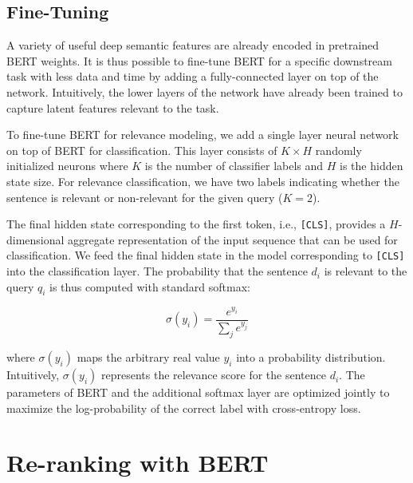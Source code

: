
\subsection{Fine-Tuning}

A variety of useful deep semantic features are already encoded in pretrained BERT weights.
It is thus possible to fine-tune BERT for a specific downstream task with less data and time by adding a fully-connected layer on top of the network.
Intuitively, the lower layers of the network have already been trained to capture latent features relevant to the task.

To fine-tune BERT for relevance modeling, we add a single layer neural network on top of BERT for classification.
This layer consists of $ K \times H $ randomly initialized neurons where $ K $ is the number of classifier labels and $ H$ is the hidden state size.
For relevance classification, we have two labels indicating whether the sentence is relevant or non-relevant for the given query ($ K = 2 $).

The final hidden state corresponding to the first token, i.e., \texttt{[CLS]}, provides a $ H $-dimensional aggregate representation of the input sequence that can be used for classification.
We feed the final hidden state in the model corresponding to \texttt{[CLS]} into the classification layer.
The probability that the sentence $ d_i $ is relevant to the query $ q_i $ is thus computed with standard softmax:
 
\begin{equation}
\sigma (y_i) = \frac{e^{y_i}}{\sum_j e^{y_j}}
\end{equation}

\noindent where $\sigma (y_i)$ maps the arbitrary real value $ y_i $ into a probability distribution.
Intuitively, $\sigma (y_i)$ represents the relevance score for the sentence $ d_i $.
The parameters of BERT and the additional softmax layer are optimized jointly to maximize the log-probability of the correct label with cross-entropy loss.

\section{Re-ranking with BERT}



